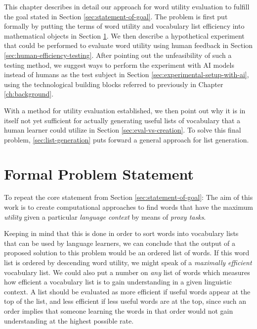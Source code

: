 This chapter describes in detail our approach for word utility evaluation to fulfill the goal stated in Section \ref{sec:statement-of-goal}.
The problem is first put formally by putting the terms of word utility and vocabulary list efficiency into mathematical objects in Section \ref{sec:formal-problem-statement}.
We then describe a hypothetical experiment that could be performed to evaluate word utility using human feedback in Section \ref{sec:human-efficiency-testing}.
After pointing out the unfeasibility of such a testing method, we suggest ways to perform the experiment with AI models instead of humans as the test subject in Section \ref{sec:experimental-setup-with-ai}, using the technological building blocks referred to previously in Chapter \ref{ch:background}.

With a method for utility evaluation established, we then point out why it is in itself not yet sufficient for actually generating useful lists of vocabulary that a human learner could utilize in Section \ref{sec:eval-vs-creation}.
To solve this final problem, \ref{sec:list-generation} puts forward a general approach for list generation.

\section{Formal Problem Statement} \label{sec:formal-problem-statement}

To repeat the core statement from Section \ref{sec:statement-of-goal}:
The aim of this work is to create computational approaches to find words that have the maximum \textit{utility} given a particular \textit{language context} by means of \textit{proxy tasks}.

Keeping in mind that this is done in order to sort words into vocabulary lists that can be used by language learners, we can conclude that the output of a proposed solution to this problem would be an ordered list of words.
If this word list is ordered by descending word utility, we might speak of a \textit{maximally efficient} vocabulary list.
We could also put a number on \textit{any} list of words which measures how efficient a vocabulary list is to gain understanding in a given linguistic context.
A list should be evaluated as more efficient if useful words appear at the top of the list, and less efficient if less useful words are at the top, since such an order implies that someone learning the words in that order would not gain understanding at the highest possible rate.

